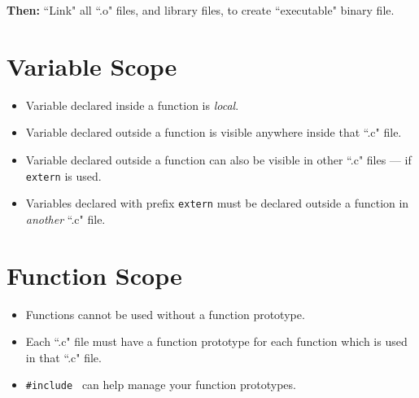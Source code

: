 \documentclass{article}	%
\begin{document}
{\bf Then: } ``Link" all ``.o" files, and library files,
	to create ``executable" binary file. 
\section{Variable Scope}

\begin{itemize}
	\item Variable declared  inside a function is {\it local}.
	\item Variable declared outside a function is visible anywhere 
inside that ``.c" file.
	\item Variable declared outside a function can also be visible in 
other ``.c" files --- if {\tt extern} is used.
	\item Variables declared with prefix {\tt extern} must be declared
outside a function in {\it another } ``.c" file.
\end{itemize}


\section{Function Scope}
\begin{itemize}

\item
Functions cannot be used without a function prototype.

\item
Each ``.c" file must have a function prototype for each function which is used
in that ``.c" file. 

\item
{\tt \#include } can help manage your function prototypes. 

\end{itemize}
\end{document}
